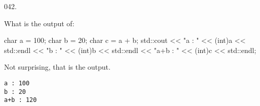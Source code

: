 \documentclass[]{book}
\newenvironment{Shaded}{}{}
\newcommand{\BuiltInTok}[1]{#1}
\newcommand{\DataTypeTok}[1]{\textcolor[rgb]{0.56,0.13,0.00}{#1}}
\newcommand{\DecValTok}[1]{\textcolor[rgb]{0.25,0.63,0.44}{#1}}
\newcommand{\NormalTok}[1]{#1}
\newcommand{\StringTok}[1]{\textcolor[rgb]{0.25,0.44,0.63}{#1}}
\begin{document}
\vspace{2mm}\noindent\hrulefill{}

\begin{minipage}{\linewidth}\noindent
{\tiny 042.}\\
\begin{minipage}[t]{.485\linewidth}

What is the output of:

\begin{framed}

\begin{Shaded}
\begin{Highlighting}[]
\DataTypeTok{char}\NormalTok{ a = }\DecValTok{100}\NormalTok{;}
\DataTypeTok{char}\NormalTok{ b = }\DecValTok{20}\NormalTok{;}
\DataTypeTok{char}\NormalTok{ c = a + b;}
\BuiltInTok{std::}\NormalTok{cout << }\StringTok{"a : "}\NormalTok{ << (}\DataTypeTok{int}\NormalTok{)a << }\BuiltInTok{std::}\NormalTok{endl}
\NormalTok{          << }\StringTok{"b : "}\NormalTok{ << (}\DataTypeTok{int}\NormalTok{)b << }\BuiltInTok{std::}\NormalTok{endl}
\NormalTok{          << }\StringTok{"a+b : "}\NormalTok{ << (}\DataTypeTok{int}\NormalTok{)c << }\BuiltInTok{std::}\NormalTok{endl;}
\end{Highlighting}
\end{Shaded}

\end{framed}

\end{minipage}
\hfill
\begin{minipage}[t]{.485\linewidth}

Not surprising, that is the output.

\begin{framed}

\begin{verbatim}
a : 100
b : 20
a+b : 120
\end{verbatim}

\end{framed}

\end{minipage}
\end{minipage}

\vspace{2mm}\noindent\hrulefill{}
\end{document}
